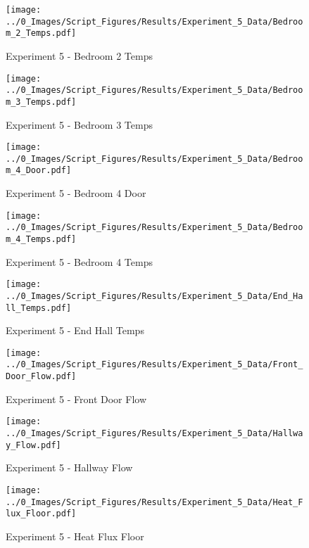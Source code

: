 	\clearpage

	\begin{figure}[H]
		\centering
		\texttt{[image: ../0\_Images/Script\_Figures/Results/Experiment\_5\_Data/Bedroom\_2\_Temps.pdf]}
		\caption[]{Experiment 5 - Bedroom 2 Temps}
	\end{figure}
 

	\begin{figure}[H]
		\centering
		\texttt{[image: ../0\_Images/Script\_Figures/Results/Experiment\_5\_Data/Bedroom\_3\_Temps.pdf]}
		\caption[]{Experiment 5 - Bedroom 3 Temps}
	\end{figure}
 
	\clearpage

	\begin{figure}[H]
		\centering
		\texttt{[image: ../0\_Images/Script\_Figures/Results/Experiment\_5\_Data/Bedroom\_4\_Door.pdf]}
		\caption[]{Experiment 5 - Bedroom 4 Door}
	\end{figure}
 

	\begin{figure}[H]
		\centering
		\texttt{[image: ../0\_Images/Script\_Figures/Results/Experiment\_5\_Data/Bedroom\_4\_Temps.pdf]}
		\caption[]{Experiment 5 - Bedroom 4 Temps}
	\end{figure}
 
	\clearpage

	\begin{figure}[H]
		\centering
		\texttt{[image: ../0\_Images/Script\_Figures/Results/Experiment\_5\_Data/End\_Hall\_Temps.pdf]}
		\caption[]{Experiment 5 - End Hall Temps}
	\end{figure}
 

	\begin{figure}[H]
		\centering
		\texttt{[image: ../0\_Images/Script\_Figures/Results/Experiment\_5\_Data/Front\_Door\_Flow.pdf]}
		\caption[]{Experiment 5 - Front Door Flow}
	\end{figure}
 
	\clearpage

	\begin{figure}[H]
		\centering
		\texttt{[image: ../0\_Images/Script\_Figures/Results/Experiment\_5\_Data/Hallway\_Flow.pdf]}
		\caption[]{Experiment 5 - Hallway Flow}
	\end{figure}
 

	\begin{figure}[H]
		\centering
		\texttt{[image: ../0\_Images/Script\_Figures/Results/Experiment\_5\_Data/Heat\_Flux\_Floor.pdf]}
		\caption[]{Experiment 5 - Heat Flux Floor}
	\end{figure}
 

